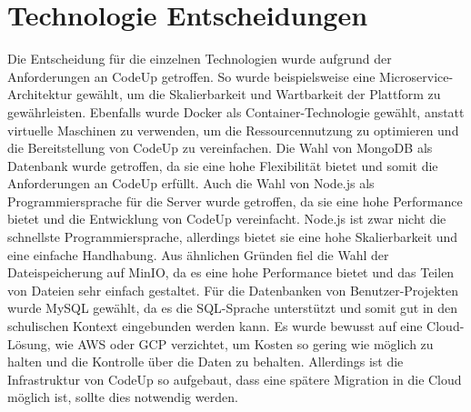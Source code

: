 \documentclass[main.tex]{subfiles}
\begin{document}
    \section{Technologie Entscheidungen}
    Die Entscheidung für die einzelnen Technologien wurde aufgrund der Anforderungen an CodeUp getroffen.
    So wurde beispielsweise eine Microservice-Architektur gewählt, um die Skalierbarkeit und Wartbarkeit der Plattform zu gewährleisten.
    Ebenfalls wurde Docker als Container-Technologie gewählt, anstatt virtuelle Maschinen zu verwenden, um die Ressourcennutzung zu optimieren und die Bereitstellung von CodeUp zu vereinfachen.
    Die Wahl von MongoDB als Datenbank wurde getroffen, da sie eine hohe Flexibilität bietet und somit die Anforderungen an CodeUp erfüllt.
    Auch die Wahl von Node.js als Programmiersprache für die Server wurde getroffen, da sie eine hohe Performance bietet und die Entwicklung von CodeUp vereinfacht.
    Node.js ist zwar nicht die schnellste Programmiersprache, allerdings bietet sie eine hohe Skalierbarkeit und eine einfache Handhabung.
    Aus ähnlichen Gründen fiel die Wahl der Dateispeicherung auf MinIO, da es eine hohe Performance bietet und das Teilen von Dateien sehr einfach gestaltet.
    Für die Datenbanken von Benutzer-Projekten wurde MySQL gewählt, da es die SQL-Sprache unterstützt und somit gut in den schulischen Kontext eingebunden werden kann.
    Es wurde bewusst auf eine Cloud-Lösung, wie AWS oder GCP verzichtet, um Kosten so gering wie möglich zu halten und die Kontrolle über die Daten zu behalten.
    Allerdings ist die Infrastruktur von CodeUp so aufgebaut, dass eine spätere Migration in die Cloud möglich ist, sollte dies notwendig werden.
\end{document}
